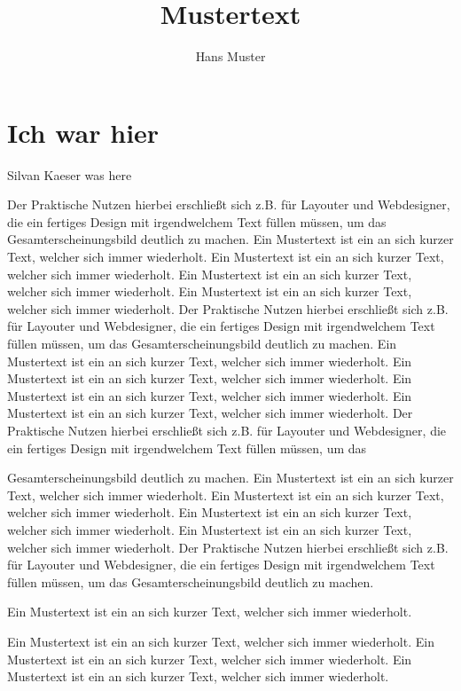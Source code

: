 \documentclass{article}
\title{Mustertext}
\author{Hans Muster}
\begin{document}
\maketitle
\section{Ich war hier}
Silvan Kaeser was here

Der Praktische Nutzen hierbei erschließt sich z.B. für Layouter und Webdesigner, die ein fertiges Design mit irgendwelchem Text füllen müssen, um das Gesamterscheinungsbild deutlich zu machen. Ein Mustertext ist ein an sich kurzer Text, welcher sich immer wiederholt. Ein Mustertext ist ein an sich kurzer Text, welcher sich immer wiederholt.\cite{Illuminati}
Ein Mustertext ist ein an sich kurzer Text, welcher sich immer wiederholt. Ein Mustertext ist ein an sich kurzer Text, welcher sich immer wiederholt. Der Praktische Nutzen hierbei erschließt sich z.B. für Layouter und Webdesigner, die ein fertiges Design mit irgendwelchem Text füllen müssen, um das Gesamterscheinungsbild deutlich zu machen.\cite{Zoo} Ein Mustertext ist ein an sich kurzer Text, welcher sich immer wiederholt. Ein Mustertext ist ein an sich kurzer Text, welcher sich immer wiederholt. Ein Mustertext ist ein an sich kurzer Text, welcher sich immer wiederholt. Ein Mustertext ist ein an sich kurzer Text, welcher sich immer wiederholt. Der Praktische Nutzen hierbei erschließt sich z.B. für Layouter und Webdesigner, die ein fertiges Design mit irgendwelchem Text füllen müssen, um das

Gesamterscheinungsbild deutlich zu machen. Ein Mustertext ist ein an sich kurzer Text, welcher sich immer wiederholt. Ein Mustertext ist ein an sich kurzer Text, welcher sich immer wiederholt. Ein Mustertext ist ein an sich kurzer Text, welcher sich immer wiederholt. Ein Mustertext ist ein an sich kurzer Text, welcher sich immer wiederholt. Der Praktische Nutzen hierbei erschließt sich z.B. für Layouter und Webdesigner, die ein fertiges Design mit irgendwelchem Text füllen müssen, um das Gesamterscheinungsbild deutlich zu machen.\cite{Armee}

\begin{center}
    Ein Mustertext
    ist ein an
    sich kurzer
    Text,
    welcher
	sich immer wiederholt.
\end{center}
Ein Mustertext ist ein an sich kurzer Text, welcher sich immer wiederholt. Ein Mustertext ist ein an sich kurzer Text, welcher sich immer wiederholt. Ein Mustertext ist ein an sich kurzer Text, welcher sich immer wiederholt. 



\end{document}
